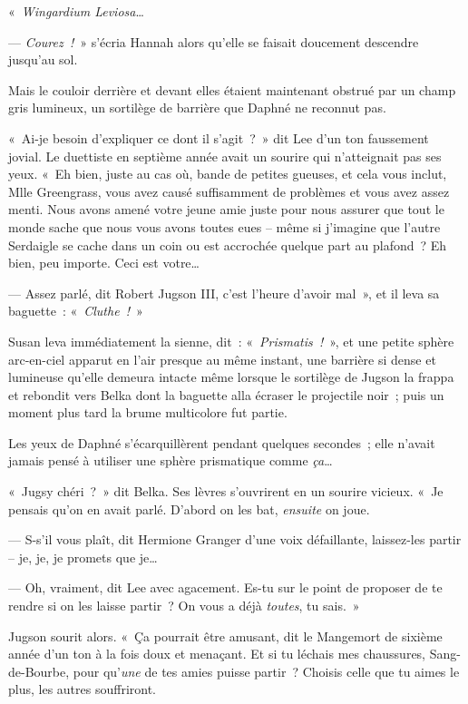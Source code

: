 «~\emph{Wingardium Leviosa}…

--- \emph{Courez~!}~» s'écria Hannah alors qu'elle se faisait doucement descendre jusqu'au sol.

Mais le couloir derrière et devant elles étaient maintenant obstrué par un champ gris lumineux, un sortilège de barrière que Daphné ne reconnut pas.

«~Ai-je besoin d'expliquer ce dont il s'agit~?~» dit Lee d'un ton faussement jovial. Le duettiste en septième année avait un sourire qui n'atteignait pas ses yeux. «~Eh bien, juste au cas où, bande de petites gueuses, et cela vous inclut, Mlle Greengrass, vous avez causé suffisamment de problèmes et vous avez assez menti. Nous avons amené votre jeune amie juste pour nous assurer que tout le monde sache que nous vous avons toutes eues -- même si j'imagine que l'autre Serdaigle se cache dans un coin ou est accrochée quelque part au plafond~? Eh bien, peu importe. Ceci est votre…

--- Assez parlé, dit Robert Jugson III, c'est l'heure d'avoir mal~», et il leva sa baguette~: «~\emph{Cluthe~!}~»

Susan leva immédiatement la sienne, dit~: «~\emph{Prismatis~!}~», et une petite sphère arc-en-ciel apparut en l'air presque au même instant, une barrière si dense et lumineuse qu'elle demeura intacte même lorsque le sortilège de Jugson la frappa et rebondit vers Belka dont la baguette alla écraser le projectile noir~; puis un moment plus tard la brume multicolore fut partie.

Les yeux de Daphné s'écarquillèrent pendant quelques secondes~; elle n'avait jamais pensé à utiliser une sphère prismatique comme \emph{ça}…

«~Jugsy chéri~?~» dit Belka. Ses lèvres s'ouvrirent en un sourire vicieux. «~Je pensais qu'on en avait parlé. D'abord on les bat, \emph{ensuite} on joue.

--- S-s'il vous plaît, dit Hermione Granger d'une voix défaillante, laissez-les partir -- je, je, je promets que je…

--- Oh, vraiment, dit Lee avec agacement. Es-tu sur le point de proposer de te rendre si on les laisse partir~? On vous a déjà \emph{toutes}, tu sais.~»

Jugson sourit alors. «~Ça pourrait être amusant, dit le Mangemort de sixième année d'un ton à la fois doux et menaçant. Et si tu léchais mes chaussures, Sang-de-Bourbe, pour qu'\emph{une} de tes amies puisse partir~? Choisis celle que tu aimes le plus, les autres souffriront.

